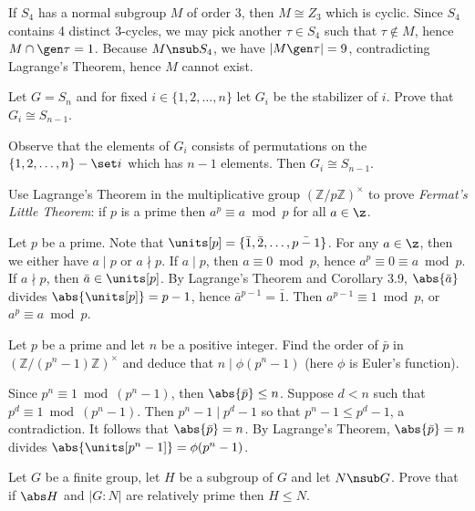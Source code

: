 \begin{problems}
\begin{sol}
        If $S_4$ has a normal subgroup $M$ of order 3, then $M \cong Z_3$ which is cyclic. Since $S_4$ contains 4 distinct 3-cycles, we may pick another $\tau \in S_4$ such that $\tau \not\in M$, hence $M \cap \gen\tau = 1$. Because $M \nsub S_4$, we have $|M \gen\tau| = 9$, contradicting Lagrange's Theorem, hence $M$ cannot exist.
    \end{sol}
    \item Let $G = S_n$ and for fixed $i \in \{1, 2, \dots, n\}$ let $G_i$ be the stabilizer of $i$. Prove that $G_i \cong S_{n-1}$.
    \begin{sol}
        Observe that the elements of $G_i$ consists of permutations on the $\{1, 2, \ldots, n\} - \set i$ which has $n - 1$ elements. Then $G_i \cong S_{n - 1}$.
    \end{sol}
    \item Use Lagrange's Theorem in the multiplicative group $(\mathbb{Z}/p\mathbb{Z})^\times$ to prove \textit{Fermat's Little Theorem}: if $p$ is a prime then $a^p \equiv a \bmod p$ for all $a \in \z$.
    \begin{sol}
        Let $p$ be a prime. Note that $\units[p] = \{\bar 1, \bar 2, \ldots, \bar{p - 1}\}$. For any $a \in \z$, then we either have $a \mid p$ or $a \nmid p$. If $a \mid p$, then $a \equiv 0 \bmod p$, hence $a^p \equiv 0 \equiv a \bmod p$. If $a \nmid p$, then $\bar a \in \units[p]$. By Lagrange's Theorem and Corollary 3.9, $\abs{\bar a}$ divides $\abs{\units[p]} = p - 1$, hence $\bar a^{p - 1} = \bar 1$. Then $a^{p - 1} \equiv 1 \bmod p$, or $a^p \equiv a \bmod p$.
    \end{sol}
    \item Let $p$ be a prime and let $n$ be a positive integer. Find the order of $\bar p$ in $(\mathbb{Z}/(p^n - 1)\mathbb{Z})^\times$ and deduce that $n \mid \phi(p^n - 1)$ (here $\phi$ is Euler's function).
    \begin{sol}
        Since $p^n \equiv 1 \bmod (p^n - 1)$, then $\abs{\bar p} \leq n$. Suppose $d < n$ such that $p^d \equiv 1 \bmod (p^n - 1)$. Then $p^n - 1 \mid p^d - 1$ so that $p^n - 1 \leq p^d - 1$, a contradiction. It follows that $\abs{\bar p} = n$. By Lagrange's Theorem, $\abs{\bar p} = n$ divides $\abs{\units[p^n - 1]} = \phi(p^n - 1)$.
    \end{sol}
    \item Let $G$ be a finite group, let $H$ be a subgroup of $G$ and let $N \nsub G$. Prove that if $\abs H$ and $|G : N|$ are relatively prime then $H \leq N$.
    \begin{sol}

\end{sol}
\end{problems}
